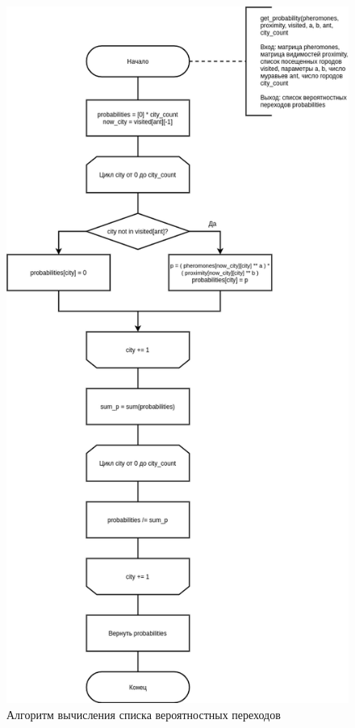 \begin{figure}[H]
	\begin{center}
		\includegraphics[scale=0.5]{img/probability.png}
	\end{center}
	\captionsetup{justification=centering}
	\caption{Алгоритм вычисления списка вероятностных переходов}
	\label{img:probability}
\end{figure}

